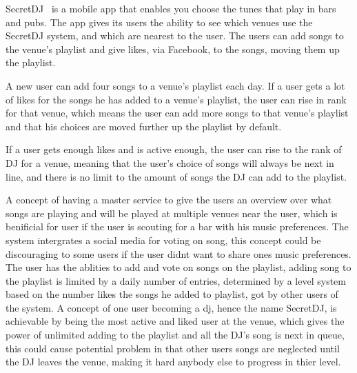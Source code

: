SecretDJ~\cite{secretDJ} is a mobile app that enables you choose the tunes that play in bars and pubs. The app gives its users the ability to see which venues use the SecretDJ system, and which are nearest to the user. The users can add songs to the venue's playlist and give likes, via Facebook, to the songs, moving them up the playlist.

A new user can add four songs to a venue's playlist each day. If a user gets a lot of likes for the songs he has added to a venue's playlist, the user can rise in rank for that venue, which means the user can add more songs to that venue's playlist and that his choices are moved further up the playlist by default.

If a user gets enough likes and is active enough, the user can rise to the rank of DJ for a venue, meaning that the user's choice of songs will always be next in line, and there is no limit to the amount of songs the DJ can add to the playlist.

A concept of having a master service to give the users an overview over what songs are playing and will be played at multiple venues near the user, which is benificial for user if the user is scouting for a bar with his music preferences. The system intergrates a social media for voting on song, this concept could be discouraging to some users if the user didnt want to share ones music preferences. The user has the ablities to add and vote on songs on the playlist, adding song to the playlist is limited by a daily number of entries, determined by a level system based on the number likes the songs he added to playlist, got by other users of the system. A concept of one user becoming a dj, hence the name SecretDJ, is achievable by being the most active and liked user at the venue, which gives the power of unlimited adding to the playlist and all the DJ's song is next in queue, this could cause potential problem in that other users songs are neglected until the DJ leaves the venue, making it hard anybody else to progress in thier level.
